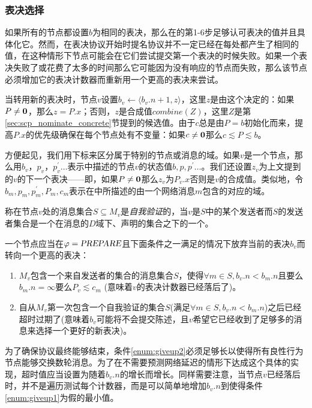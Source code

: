 \subsubsection{表决选择}

如果所有的节点都设置$b$为相同的表决，那么在的第1-6步足够认可表决的值并且具体化它。然而，在表决协议开始时提名协议并不一定已经在每处都产生了相同的值，在这种情形下节点可能会在它们尝试提交第一个表决的时候失败。如果一个表决失败了或花费了太多的时间那么它可能因为没有响应的节点而失败，那么该节点必须增加它的表决计数器而重新用一个更高的表决来尝试。

当转用新的表决时，节点$v$设置$b_v\leftarrow \langle b_v.n+1,z\rangle$，这里$z$是由这个决定的：如果$P\neq {\bm 0}$，那么$z=P.x$；否则，$z$是合成值$combine(Z)$，这里$Z$是第\ref{sec:scp_nominate_concrete}节提到的候选值。由于$c$总是由$P=b$初始化而来，提高$P.x$的优先级确保在每个节点处有不变量：如果$c\neq {\bm 0}$那么$c\lesssim P\lesssim b$。

方便起见，我们用下标来区分属于特别的节点或消息的域。如果$v$是一个节点，那么用$b_v$，$p_v$，$p_v^{\prime}\ldots$表示中描述的节点$v$的状态值$b,p,p^{\prime}\ldots$。我们还设置$z_v$为上文提到的$v$的下一个表决——即，如果$P\neq {\bm 0}$那么$z_v$为$P_v.x$否则是$v$的合成值。类似地，令$b_m,p_m,p^{\prime}_m,P_m,c_m$表示在中所描述的由一个网络消息$m$包含的对应的域。

\begin{definition}[自我验证]
	称在节点$v$处的消息集合$S\subseteq M_v$是\textit{自我验证}的，当$v$是$S$中的某个发送者而$S$的发送者集合是一个在消息的$D$域下、声明的{\quorum}集合之下的一个{\quorum}。
\end{definition}

一个节点应当在$\varphi=\textsl{PREPARE}$且下面条件之一满足的情况下放弃当前的表决$b_v$而转向一个更高的表决：

\begin{enumerate}
	\item\label{enum:giveup1} $M_v$包含一个来自发送者的{\vblock}集合的消息集合$S$，使得$\forall m\in S,b_v.n<b_m.n$且要么$b_m.n=\infty$要么$P_v\lesssim c_m$ (意味着$v$的表决计数器已经落后了)。
	\item\label{enum:giveup2} 自从$M_v$第一次包含一个自我验证的集合$S$(满足$\forall m\in S,b_v.n<b_m.n$)之后已经超时过期了(意味着$b_v$可能将不会提交陈述，且$v$希望它已经收到了足够多的消息来选择一个更好的新表决)。
\end{enumerate}

为了确保协议最终能够结束，条件\ref{enum:giveup2}必须足够长以使得所有良性行为节点能够交换数轮消息。为了在不需要预测网络延迟的情形下达成这个具体的实现，超时值应当设置为随着$b_v.n$的增长而增长。同样需要注意，当节点$v$已经落后时，并不是遍历测试每个计数器，而是可以简单地增加$b_v.n$到使得条件\ref{enum:giveup1}为假的最小值。